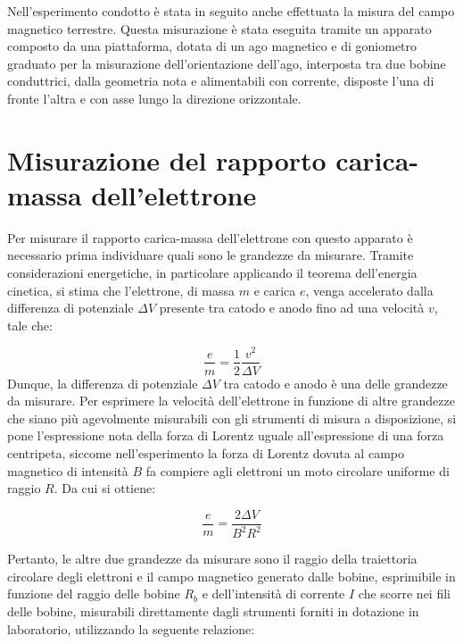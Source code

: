 \documentclass[a4paper,12pt]{article}
\begin{document}
Nell’esperimento condotto è stata in seguito anche effettuata la misura del campo magnetico terrestre. Questa misurazione è stata eseguita tramite un apparato composto da una piattaforma, dotata di un ago magnetico e di goniometro graduato per la misurazione dell’orientazione dell’ago, interposta tra due bobine conduttrici, dalla geometria nota e alimentabili con corrente, disposte l’una di fronte l’altra e con asse lungo la direzione orizzontale. 

\section{Misurazione del rapporto carica-massa dell’elettrone}
Per misurare il rapporto carica-massa dell’elettrone con questo apparato è necessario prima individuare quali sono le grandezze da misurare.
Tramite considerazioni energetiche, in particolare applicando il teorema dell’energia cinetica, si stima che l’elettrone, di massa \( m \) e carica \( e \), venga accelerato dalla differenza di potenziale \( \Delta V \) presente tra catodo e anodo fino ad una velocità \( v \), tale che:

\begin{equation}
    \frac{e}{m} = \frac{1}{2} \frac{v^2}{\Delta V}
    \label{eq:rapporto_carica_massa}
\end{equation}
Dunque, la differenza di potenziale \( \Delta V \) tra catodo e anodo è una delle grandezze da misurare.
Per esprimere la velocità dell’elettrone in funzione di altre grandezze che siano più agevolmente misurabili con gli strumenti di misura a disposizione, si pone l’espressione nota della forza di Lorentz uguale all’espressione di una forza centripeta, siccome nell’esperimento la forza di Lorentz dovuta al campo magnetico di intensità \( B \) fa compiere agli elettroni un moto circolare uniforme di raggio \( R \). Da cui si ottiene:

\begin{equation}
    \frac{e}{m} = \frac{2 \Delta V}{B^2 R^2}
    \label{eq:forza_lorentz}
\end{equation}

Pertanto, le altre due grandezze da misurare sono il raggio della traiettoria circolare degli elettroni e il campo magnetico generato dalle bobine, esprimibile in funzione del raggio delle bobine \( R_b \) e dell’intensità di corrente \( I \) che scorre nei fili delle bobine, misurabili direttamente dagli strumenti forniti in dotazione in laboratorio, utilizzando la seguente relazione:
\end{document}
